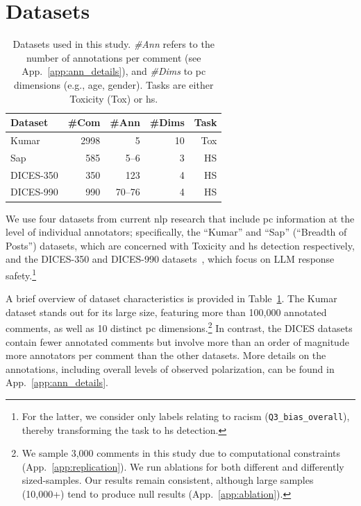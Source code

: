 \documentclass[11pt]{article}
\theoremstyle{definition}
\theoremstyle{plain}
\begin{document}
\section{Datasets}
\label{sec:datasets}

\begin{table}[t]
	\centering
	\small
	\begin{tabular}{lrrrr}
		\toprule
		\textbf{Dataset} & \textbf{\#Com} & \textbf{\#Ann} & \textbf{\#Dims} & \textbf{Task} \\
		\midrule
		Kumar
		& 2998 & 5   & 10 & Tox \\
		
		Sap 
		& 585       & 5--6   & 3  & HS \\
		
		DICES-350 
		& 350   & 123    & 4  & HS \\
		
		DICES-990
		& 990  & 70--76 & 4  & HS\\
		\bottomrule
	\end{tabular}
	\caption{Datasets used in this study. \textit{\#Ann} refers to the number of annotations per comment (see App.~\ref{app:ann_details}), and \textit{\#Dims} to \ac{pc} dimensions (e.g., age, gender). Tasks are either Toxicity (Tox) or \ac{hs}.}
	\label{tab:datasets}
\end{table}

We use four datasets from current \ac{nlp} research that include \ac{pc} information at the level of individual annotators; specifically, the ``Kumar'' \cite{kumar-et-al-2021} and ``Sap'' (``Breadth of Posts'') \cite{sap-etal-2022-annotators} datasets, which are concerned with Toxicity and \ac{hs} detection respectively, and the DICES-350 and DICES-990 datasets~\cite{dices}, which focus on LLM response safety.\footnote{For the latter, we consider only labels relating to racism (\texttt{Q3\_bias\_overall}), thereby transforming the task to \ac{hs} detection.}

A brief overview of dataset characteristics is provided in Table~\ref{tab:datasets}. The Kumar dataset stands out for its large size, featuring more than 100{,}000 annotated comments, as well as 10 distinct \ac{pc} dimensions.\footnote{We sample 3{,}000 comments in this study due to computational constraints (App.~\ref{app:replication}). We run ablations for both different and differently sized-samples. Our results remain consistent, although large samples (10{,}000+) tend to produce null results (App.~\ref{app:ablation}).} In contrast, the DICES datasets contain fewer annotated comments but involve more than an order of magnitude more annotators per comment than the other datasets. More details on the annotations, including overall levels of observed polarization, can be found in App.~\ref{app:ann_details}.
\end{document}
